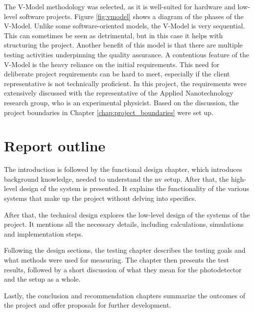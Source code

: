 The V-Model methodology was selected, as it is well-suited for hardware and low-level software projects. Figure \ref{fig:vmodel} shows a diagram of the phases of the V-Model. Unlike some software-oriented models, the V-Model is very sequential. This can sometimes be seen as detrimental, but in this case it helps with structuring the project. Another benefit of this model is that there are multiple testing activities underpinning the quality assurance. A contentious feature of the V-Model is the heavy reliance on the initial requirements. This need for deliberate project requirements can be hard to meet, especially if the client representative is not technically proficient. In this project, the requirements were extensively discussed with the representative of the Applied Nanotechnology research group, who is an experimental physicist. Based on the discussion, the project boundaries in Chapter \ref{chap:project_boundaries} were set up.



\section{Report outline}
The introduction is followed by the functional design chapter, which introduces background knowledge, needed to understand the \gls{nv} setup. After that, the high-level design of the system is presented. It explains the functionality of the various systems that make up the project without delving into specifics.

After that, the technical design explores the low-level design of the systems of the project. It mentions all the necessary details, including calculations, simulations and implementation steps.

Following the design sections, the testing chapter describes the testing goals and what methods were used for measuring. The chapter then presents the test results, followed by a short discussion of what they mean for the photodetector and the setup as a whole. 

Lastly, the conclusion and recommendation chapters summarize the outcomes of the project and offer proposals for further development. 